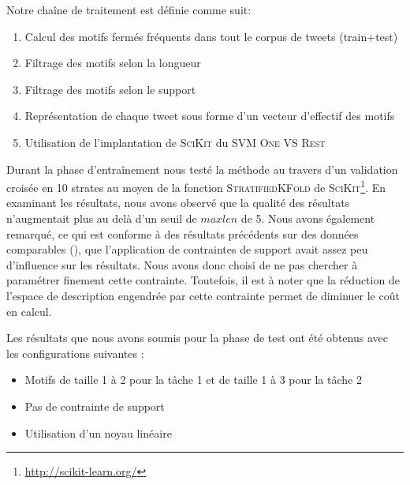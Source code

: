  Notre chaîne de traitement est définie comme suit:
\begin{enumerate}
  \item Calcul des motifs fermés fréquents dans tout le corpus de tweets (train+test)
  \item Filtrage des motifs selon la longueur
  \item Filtrage des motifs selon le support
  \item Représentation de chaque tweet sous forme d'un vecteur d'effectif des motifs
  \item Utilisation de l'implantation de \textsc{SciKit} du SVM \textsc{One VS Rest}
\end{enumerate}

 
Durant la phase d'entraînement nous testé la méthode au travers d'un validation croisée en 10 strates au moyen de la fonction \textsc{StratifiedKFold} de \textsc{SciKit}\footnote{\url{http://scikit-learn.org/}}.
 En examinant les résultats, nous avons observé que la qualité des résultats n'augmentait plus au delà d'un seuil de $maxlen$ de 5.
Nous avons également remarqué, ce qui est conforme à des résultats précédents sur des données comparables (\cite{Buscaldi-2017}), que l'application de contraintes de support avait assez peu d'influence sur les résultats.
 Nous avons donc choisi de ne pas chercher à paramétrer finement cette contrainte.
 Toutefois, il est à noter que la réduction de l'espace de description engendrée par cette contrainte permet de diminuer le coût en calcul.

 Les résultats que nous avons soumis pour la phase de test ont été obtenus avec les configurations suivantes :
\begin{itemize}
  \item Motifs de taille 1 à 2 pour la tâche 1 et de taille 1 à 3 pour la tâche 2
  \item Pas de contrainte de support
  \item Utilisation d'un noyau linéaire
\end{itemize}

